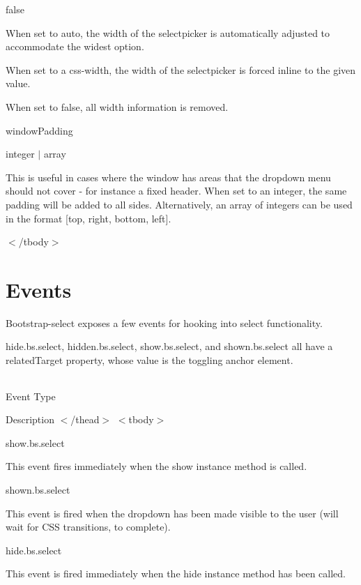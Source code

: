 {\ttfamily false} 

When set to {\ttfamily auto}, the width of the selectpicker is automatically adjusted to accommodate the widest option.

When set to a css-\/width, the width of the selectpicker is forced inline to the given value.

When set to {\ttfamily false}, all width information is removed.

window\+Padding 

integer $\vert$ array 

{} 

This is useful in cases where the window has areas that the dropdown menu should not cover -\/ for instance a fixed header. When set to an integer, the same padding will be added to all sides. Alternatively, an array of integers can be used in the format {\ttfamily \mbox{[}top, right, bottom, left\mbox{]}}.

$<$/tbody$>$ 

\section*{Events}





Bootstrap-\/select exposes a few events for hooking into select functionality.

hide.\+bs.\+select, hidden.\+bs.\+select, show.\+bs.\+select, and shown.\+bs.\+select all have a {\ttfamily related\+Target} property, whose value is the toggling anchor element.

\tabulinesep=1mm
\begin{longtabu} spread 0pt [c]{*{0}{|X[-1]}|}
\hline
\end{longtabu}


Event Type 

Description  $<$/thead$>$ $<$tbody$>$ 

show.\+bs.\+select 

This event fires immediately when the show instance method is called.  

shown.\+bs.\+select 

This event is fired when the dropdown has been made visible to the user (will wait for C\+SS transitions, to complete).  

hide.\+bs.\+select 

This event is fired immediately when the hide instance method has been called.  

